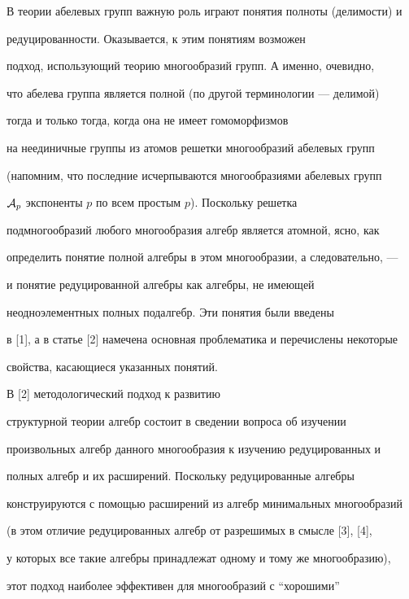 \label{begin}








В теории абелевых групп важную роль играют понятия полноты (делимости) и


редуцированности. Оказывается, к этим понятиям возможен 


подход, использующий теорию многообразий групп. А именно, очевидно,


что абелева группа является полной (по другой терминологии --- делимой)


тогда и только тогда, когда она не имеет гомоморфизмов


на неединичные группы из атомов решетки многообразий абелевых групп


(напомним, что последние исчерпываются многообразиями абелевых групп


${\cal A}_p$ экспоненты $p$ по всем простым $p$). Поскольку решетка


подмногообразий любого многообразия алгебр является атомной, ясно, как


определить понятие полной алгебры в этом многообразии, а следовательно, ---


и понятие редуцированной алгебры как алгебры, не имеющей


неодноэлементных полных подалгебр. Эти понятия были введены 


в [1], а в статье [2] намечена основная проблематика и перечислены некоторые


свойства, касающиеся указанных понятий.





В [2] методологический подход к развитию


структурной теории алгебр состоит в сведении вопроса об изучении


произвольных алгебр данного многообразия к изучению редуцированных и


полных алгебр и их расширений. Поскольку редуцированные алгебры


конструируются с помощью расширений из алгебр минимальных многообразий


(в этом отличие редуцированных алгебр от разрешимых в смысле [3], [4],


у которых все такие алгебры принадлежат одному и тому же многообразию),


этот подход наиболее эффективен для многообразий с ``хорошими''


